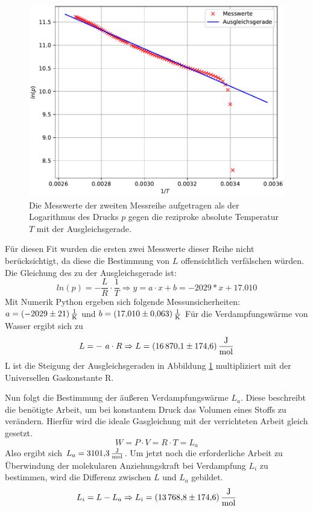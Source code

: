 \begin{figure}[H]
  \centering
  \includegraphics[width=\textwidth]{python/plotc}
  \caption{Die Messwerte der zweiten Messreihe aufgetragen als der Logarithmus des Drucks $p$
  gegen die reziproke absolute Temperatur $T$ mit der Ausgleichsgerade.}
  \label{fig:Ausgleichsgerade}
\end{figure}
Für diesen Fit wurden die ersten zwei Messwerte dieser Reihe nicht berücksichtigt, da diese die Bestimmung von $L$
offensichtlich verfälschen würden.
Die Gleichung des zu der Ausgleichsgerade ist:
\begin{equation}
  ln(p) = - \frac{L}{R} \cdot \frac{1}{T}
  \Rightarrow y = a \cdot x + b = -2029 * x + 17.010
\end{equation}
Mit Numerik Python ergeben sich folgende Messunsicherheiten: $a = \SI{-2029 \pm 21 }{\frac{1}{\kelvin}}$
und $b = \SI{17.010 \pm 0.063}{\frac{1}{\kelvin}}$
Für die Verdampfungswärme von Wasser ergibt sich zu
\begin{equation*}
  L = - \ a \cdot R \Rightarrow L = \SI{16870.1 \pm 174.6}{\frac{\J}{\mol}}
\end{equation*}
L ist die Steigung der Ausgleichsgeraden in Abbildung \ref{fig:Ausgleichsgerade} multipliziert mit der Universellen Gaskonstante R.

Nun folgt die Bestimmung der äußeren Verdampfungswärme $L_a$.
Diese beschreibt die benötigte Arbeit, um bei konstantem Druck das Volumen eines Stoffs zu verändern.
Hierfür wird die ideale Gasgleichung mit der verrichteten Arbeit gleich gesetzt.
\begin{equation}
    W = P \cdot V = R \cdot T = L_a
\end{equation}
Also ergibt sich $L_a = \SI{3101.3}{\frac{\J}{\mol}}$.
Um jetzt noch die erforderliche Arbeit zu Überwindung der molekularen Anziehungskraft bei Verdampfung $L_i$ zu bestimmen, wird
    die Differenz zwischen $L$ und $L_a$ gebildet.
\begin{equation}
    L_i = L - L_a \Rightarrow L_i = \SI{13768.8 \pm 174.6}{\frac{\J}{\mol}}
\end{equation}


